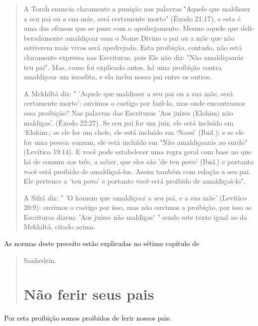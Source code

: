 \begin{quote}
A Torah enuncia claramente a punição nas palavras "Aquele que mal­disser
a seu pai ou a sua mãe, será certamente morto" (Êxodo 21:17), e esta é
uma das ofensas que se pune com o apedrejamento. Mesmo aquele que
deli­beradamente amaldiçoar com o Nome Divino o pai ou a mãe que não
estive­rem mais vivos será apedrejado. Esta proibição, contudo, não está
claramente expressa nas Escrituras, pois Ele não diz: "Não amaldiçoarás
teu pai". Mas, co­mo foi explicado antes, há uma proibição contra
amaldiçoar um israelita, e ela inclui nosso pai entre os outros.

A Mekhiltá diz: " 'Aquele que maldisser a seu pai ou a sua mãe, será
certamente morto': ouvimos o castigo por fazê-lo, mas onde encontramos
essa proibição? Nas palavras das Escrituras 'Aos juízes (Elohim) não
maldigas'. (Êxo­do 22:27). Se seu pai for um juiz, ele está incluído em
`Elohim.; se ele for um chefe, ele está incluído em
`Nassi' (Ibid.); e se ele for uma pessoa comum, ele está incluído em
"Não amaldiçoarás ao surdo" (Levítico 19:14). E você pode estabelecer
uma regra geral com base no que há de comum aos três, a saber, que eles
são 'de teu povo' (Ibid.) e portanto você está proibido de
amaldiçoá-los. Assim também com relação a seu pai. Ele pertence a 'teu
povo' e portanto você está proibido de amaldiçoá-lo".

A Sifrá diz: " 'O homem que amaldiçoar a seu pai, e a sua mãe'
(Leví­tico 20:9): ouvimos o castigo por isso, mas não ouvimos a
proibição, por isso as Escrituras dizem: 'Aos juízes não maldigas' "
sendo este texto igual ao da Mekhiltá, citado acima.
\end{quote}

As normas deste preceito estão explicadas no sétimo capítulo de

\begin{quote}
Sanhedrin.

\section{Não ferir seus pais}
\end{quote}

Por esta proibição somos proibidos de ferir nossos pais.

